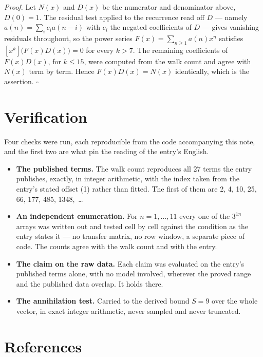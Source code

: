 \documentclass[11pt]{article}
\theoremstyle{definition}
\begin{document}
{\itshape Proof.} Let $N(x)$ and $D(x)$ be the numerator and denominator above, $D(0)=1$. The residual test applied to the recurrence read off $D$ --- namely $a(n) = \sum_i c_i a(n-i)$ with $c_i$ the negated coefficients of $D$ --- gives vanishing residuals throughout, so the power series $F(x)=\sum_{n\ge 1}a(n)x^n$ satisfies $[x^k]\bigl(F(x)D(x)\bigr) = 0$ for every $k > 7$. The remaining coefficients of $F(x)D(x)$, for $k \le 15$, were computed from the walk count and agree with $N(x)$ term by term. Hence $F(x)D(x) = N(x)$ identically, which is the assertion. $\square$

\section{Verification}

Four checks were run, each reproducible from the code accompanying this note, and the first two are what pin the reading of the entry's English.

\begin{itemize}

\item {\bfseries The published terms.} The walk count reproduces all 27 terms the entry publishes, exactly, in integer arithmetic, with the index taken from the entry's stated offset (1) rather than fitted. The first of them are 2, 4, 10, 25, 66, 177, 485, 1348,~\dots

\item {\bfseries An independent enumeration.} For $n = 1,\dots,11$ every one of the $3^{1n}$ arrays was written out and tested cell by cell against the condition as the entry states it --- no transfer matrix, no row window, a separate piece of code. The counts agree with the walk count and with the entry.

\item {\bfseries The claim on the raw data.} Each claim was evaluated on the entry's published terms alone, with no model involved, wherever the proved range and the published data overlap. It holds there.

\item {\bfseries The annihilation test.} Carried to the derived bound $S = 9$ over the whole vector, in exact integer arithmetic, never sampled and never truncated.

\end{itemize}

\section{References}
\end{document}
